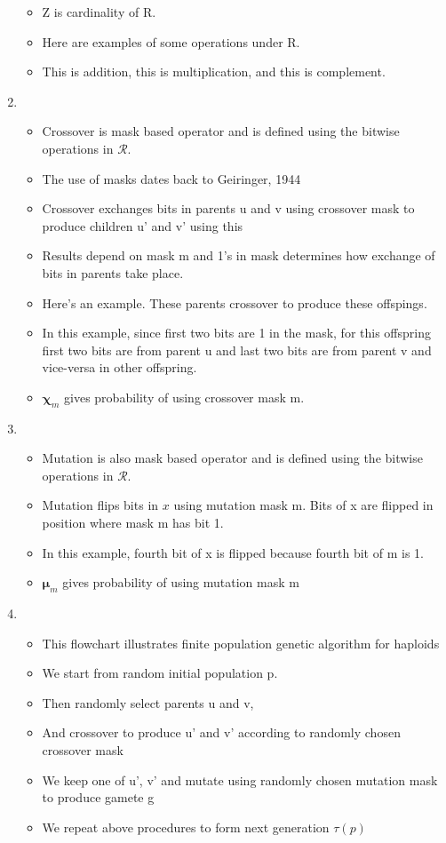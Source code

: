 \documentclass{article}
\begin{document}
\begin{enumerate}
\begin{itemize}
 \item Z is cardinality of R.

 \item Here are examples of some operations under R.
 
 \item This is addition, this is multiplication, and this is complement.
 \end{itemize}
    
\item
  \begin{itemize}
  \item Crossover is mask based operator and is defined using the
    bitwise operations in $\mathcal{R}$.
  \item The use of masks dates back to Geiringer, 1944  
  \item Crossover exchanges bits in parents u and v using crossover mask
  to produce children u' and v' using this
  \item Results depend on mask m and 1's in mask determines how exchange of bits in parents take place.
  \item Here's an example. These parents crossover to produce these offspings.
  \item In this example, since first two bits are 1 in the mask, for this offspring first two bits are from parent u and last two bits are from parent v and vice-versa in other offspring.
  \item $\bm{\chi}_m$ gives probability of using crossover mask m.
  \end{itemize}
  
\item
  \begin{itemize}
  \item Mutation is also mask based operator and is defined using the
    bitwise operations in $\mathcal{R}$.
  \item Mutation flips bits in $x$ using mutation mask m. Bits of x are flipped in position where mask m has bit 1.
  \item In this example, fourth bit of x is flipped because fourth bit of m is 1.
  \item $\bm{\mu}_m$ gives probability of using mutation mask m
  \end{itemize}
    
\item
  \begin{itemize}
  \item This flowchart illustrates finite population genetic algorithm for haploids
  \item We start from random initial population p.
  \item Then randomly select parents u and v, 
  \item And crossover to produce u' and v' according to randomly chosen crossover mask
  \item We keep one of u', v' and mutate using randomly chosen mutation mask to produce gamete g
  \item We repeat above procedures to form next generation $\tau(p)$
  \end{itemize}
  

\end{enumerate}
\end{document}
